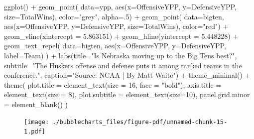 \documentclass[
  letterpaper,
  DIV=11,
  numbers=noendperiod]{scrreprt}
\newenvironment{Shaded}{\begin{snugshade}}{\end{snugshade}}
\newcommand{\AttributeTok}[1]{\textcolor[rgb]{0.40,0.45,0.13}{#1}}
\newcommand{\DecValTok}[1]{\textcolor[rgb]{0.68,0.00,0.00}{#1}}
\newcommand{\FloatTok}[1]{\textcolor[rgb]{0.68,0.00,0.00}{#1}}
\newcommand{\FunctionTok}[1]{\textcolor[rgb]{0.28,0.35,0.67}{#1}}
\newcommand{\NormalTok}[1]{\textcolor[rgb]{0.00,0.23,0.31}{#1}}
\newcommand{\SpecialCharTok}[1]{\textcolor[rgb]{0.37,0.37,0.37}{#1}}
\newcommand{\StringTok}[1]{\textcolor[rgb]{0.13,0.47,0.30}{#1}}
\begin{document}
\begin{Shaded}
\begin{Highlighting}[]
\FunctionTok{ggplot}\NormalTok{() }\SpecialCharTok{+} 
  \FunctionTok{geom\_point}\NormalTok{(}
    \AttributeTok{data=}\NormalTok{ypp, }
    \FunctionTok{aes}\NormalTok{(}\AttributeTok{x=}\NormalTok{OffensiveYPP, }\AttributeTok{y=}\NormalTok{DefensiveYPP, }\AttributeTok{size=}\NormalTok{TotalWins), }
    \AttributeTok{color=}\StringTok{"grey"}\NormalTok{, }
    \AttributeTok{alpha=}\NormalTok{.}\DecValTok{5}\NormalTok{) }\SpecialCharTok{+} 
  \FunctionTok{geom\_point}\NormalTok{(}
    \AttributeTok{data=}\NormalTok{bigten, }
    \FunctionTok{aes}\NormalTok{(}\AttributeTok{x=}\NormalTok{OffensiveYPP, }\AttributeTok{y=}\NormalTok{DefensiveYPP, }\AttributeTok{size=}\NormalTok{TotalWins), }
    \AttributeTok{color=}\StringTok{"red"}\NormalTok{) }\SpecialCharTok{+} 
  \FunctionTok{geom\_vline}\NormalTok{(}\AttributeTok{xintercept =} \FloatTok{5.863151}\NormalTok{) }\SpecialCharTok{+} 
  \FunctionTok{geom\_hline}\NormalTok{(}\AttributeTok{yintercept =} \FloatTok{5.448228}\NormalTok{) }\SpecialCharTok{+}
  \FunctionTok{geom\_text\_repel}\NormalTok{(}
    \AttributeTok{data=}\NormalTok{bigten, }
    \FunctionTok{aes}\NormalTok{(}\AttributeTok{x=}\NormalTok{OffensiveYPP, }\AttributeTok{y=}\NormalTok{DefensiveYPP, }\AttributeTok{label=}\NormalTok{Team)}
\NormalTok{  ) }\SpecialCharTok{+}
  \FunctionTok{labs}\NormalTok{(}\AttributeTok{title=}\StringTok{"Is Nebraska moving up to the Big Ten\textquotesingle{}s best?"}\NormalTok{, }\AttributeTok{subtitle=}\StringTok{"The Huskers offense and defense puts it among ranked teams in the conference."}\NormalTok{, }\AttributeTok{caption=}\StringTok{"Source: NCAA | By Matt Waite"}\NormalTok{)  }\SpecialCharTok{+} \FunctionTok{theme\_minimal}\NormalTok{() }\SpecialCharTok{+} 
  \FunctionTok{theme}\NormalTok{(}
    \AttributeTok{plot.title =} \FunctionTok{element\_text}\NormalTok{(}\AttributeTok{size =} \DecValTok{16}\NormalTok{, }\AttributeTok{face =} \StringTok{"bold"}\NormalTok{),}
    \AttributeTok{axis.title =} \FunctionTok{element\_text}\NormalTok{(}\AttributeTok{size =} \DecValTok{8}\NormalTok{), }
    \AttributeTok{plot.subtitle =} \FunctionTok{element\_text}\NormalTok{(}\AttributeTok{size=}\DecValTok{10}\NormalTok{), }
    \AttributeTok{panel.grid.minor =} \FunctionTok{element\_blank}\NormalTok{()}
\NormalTok{    )}
\end{Highlighting}
\end{Shaded}

\begin{figure}[H]

{\centering \texttt{[image: ./bubblecharts\_files/figure-pdf/unnamed-chunk-15-1.pdf]}

}

\end{figure}
\end{document}
